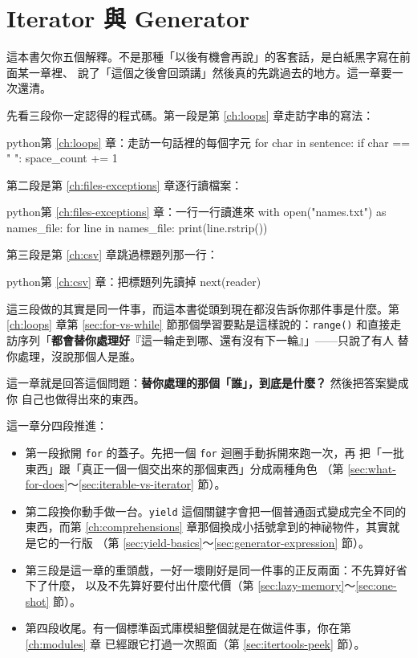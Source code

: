\chapter{Iterator 與 Generator}
\label{ch:iterators-generators}

這本書欠你五個解釋。不是那種「以後有機會再說」的客套話，是白紙黑字寫在前面某一章裡、
說了「這個之後會回頭講」然後真的先跳過去的地方。這一章要一次還清。

先看三段你一定認得的程式碼。第一段是第 \ref{ch:loops} 章走訪字串的寫法：

\begin{code}{python}{第 \ref{ch:loops} 章：走訪一句話裡的每個字元}
for char in sentence:
    if char == " ":
        space_count += 1
\end{code}

第二段是第 \ref{ch:files-exceptions} 章逐行讀檔案：

\begin{code}{python}{第 \ref{ch:files-exceptions} 章：一行一行讀進來}
with open("names.txt") as names_file:
    for line in names_file:
        print(line.rstrip())
\end{code}

第三段是第 \ref{ch:csv} 章跳過標題列那一行：

\begin{code}{python}{第 \ref{ch:csv} 章：把標題列先讀掉}
next(reader)
\end{code}

這三段做的其實是同一件事，而這本書從頭到現在都沒告訴你那件事是什麼。第
\ref{ch:loops} 章第 \ref{sec:for-vs-while} 節那個學習要點是這樣說的：\texttt{range()}
和直接走訪序列「\textbf{都會替你處理好}『這一輪走到哪、還有沒有下一輪』」——只說了有人
替你處理，沒說那個人是誰。

這一章就是回答這個問題：\textbf{替你處理的那個「誰」，到底是什麼？} 然後把答案變成你
自己也做得出來的東西。

這一章分四段推進：

\begin{itemize}
\item 第一段掀開 \texttt{for} 的蓋子。先把一個 \texttt{for} 迴圈手動拆開來跑一次，再
把「一批東西」跟「真正一個一個交出來的那個東西」分成兩種角色
（第 \ref{sec:what-for-does}～\ref{sec:iterable-vs-iterator} 節）。
\item 第二段換你動手做一台。\texttt{yield} 這個關鍵字會把一個普通函式變成完全不同的
東西，而第 \ref{ch:comprehensions} 章那個換成小括號拿到的神祕物件，其實就是它的一行版
（第 \ref{sec:yield-basics}～\ref{sec:generator-expression} 節）。
\item 第三段是這一章的重頭戲，一好一壞剛好是同一件事的正反兩面：不先算好省下了什麼，
以及不先算好要付出什麼代價（第 \ref{sec:lazy-memory}～\ref{sec:one-shot} 節）。
\item 第四段收尾。有一個標準函式庫模組整個就是在做這件事，你在第 \ref{ch:modules} 章
已經跟它打過一次照面（第 \ref{sec:itertools-peek} 節）。
\end{itemize}

